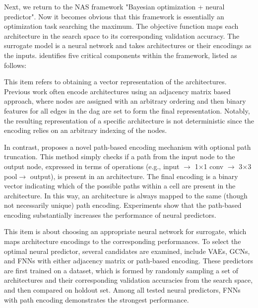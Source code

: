 Next, we return to the NAS framework "Bayesian optimization + neural predictor". Now it becomes obvious that this framework is essentially an optimization task searching the maximum. The objective function maps each architecture in the search space to its corresponding validation accuracy. The surrogate model is a neural network and takes architectures or their encodings as the inputs. \cite{white2019bananas} identifies five critical components within the framework, listed as follows:

\begin{description}[leftmargin=0cm, listparindent=\parindent]
	\item [Architecture Encoding] This item refers to obtaining a vector representation of the architectures. Previous work often encode architectures using an adjacency matrix based approach, where nodes are assigned with an arbitrary ordering  and then binary features for all edges in the \gls{dag} are set to form the final representation.	Notably, the resulting representation of a specific architecture is not deterministic since the encoding  relies on an arbitrary indexing of the nodes. 
 
	In contrast, \cite{white2019bananas} proposes a novel path-based encoding mechanism with optional path truncation. This method simply checks if a path from the input node to the output node, expressed in terms of operations (e.g., input $\rightarrow$ 1$\times$1 conv $\rightarrow$ 3$\times$3 pool$\rightarrow$ output), is present in an architecture. The final encoding is a binary vector indicating which of the possible paths within a cell are present in the architecture. In this way, an architecture is always mapped to the same (though not necessarily unique) path encoding. Experiments show that the path-based encoding substantially increases the performance of neural predictors.
	
	\item [Neural Predictor] This item is about choosing an appropriate neural network for surrogate, which maps architecture encodings to the corresponding performances. To select the optimal neural predictor, several candidates are examined, include VAEs, GCNs, and FNNs with either adjacency matrix or path-based encoding. These predictors are first trained on a dataset, which is formed by randomly sampling a set of architectures and their corresponding validation accuracies from the search space, and then compared on holdout set. Among all tested neural predictors, FNNs with path encoding demonstrates the strongest performance.
	 

\end{description}
